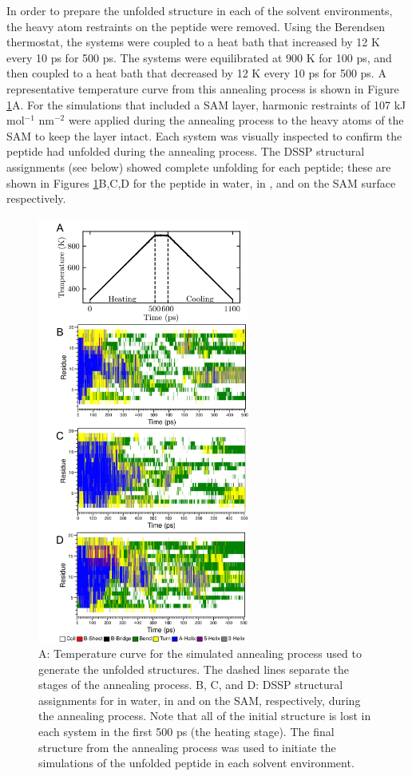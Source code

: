 In order to prepare the unfolded structure in each of the solvent environments, the heavy atom restraints on the peptide were removed. 
Using the Berendsen thermostat, the systems were coupled to a heat bath that increased by 12 K every 10 ps for 500 ps. 
The systems were equilibrated at 900 K for 100 ps, and then coupled to a heat bath that decreased by 12 K every 10 ps for 500 ps. 
A representative temperature curve from this annealing process is shown in Figure \ref{fig:helix-anneal}A. 
For the simulations that included a SAM layer, harmonic restraints of 107 kJ mol$^{-1}$ nm$^{-2}$ were applied during the annealing process to the heavy atoms of the SAM to keep the layer intact. 
Each system was visually inspected to confirm the peptide had unfolded during the annealing process. 
The DSSP structural assignments (see below) showed complete unfolding for each peptide; 
these are shown in Figures \ref{fig:helix-anneal}B,C,D for the peptide in water, in \tbawat{}, and on the SAM surface respectively.

\begin{figure}
    \center
    \includegraphics[width=2.75in]{figures-helix/unfolding.png}
    \caption[Annealing procedure used to unfold \pep{}]{
        A: Temperature curve for the simulated annealing process used to generate the unfolded structures. 
        The dashed lines separate the stages of the annealing process. 
        B, C, and D: DSSP structural assignments for \pep{} in water, in \tbawat{} and on the SAM, respectively, during the annealing process. 
        Note that all of the initial structure is lost in each system in the first 500 ps (the heating stage). 
        The final structure from the annealing process was used to initiate the simulations of the unfolded peptide in each solvent environment.
    }
    \label{fig:helix-anneal}
\end{figure}

